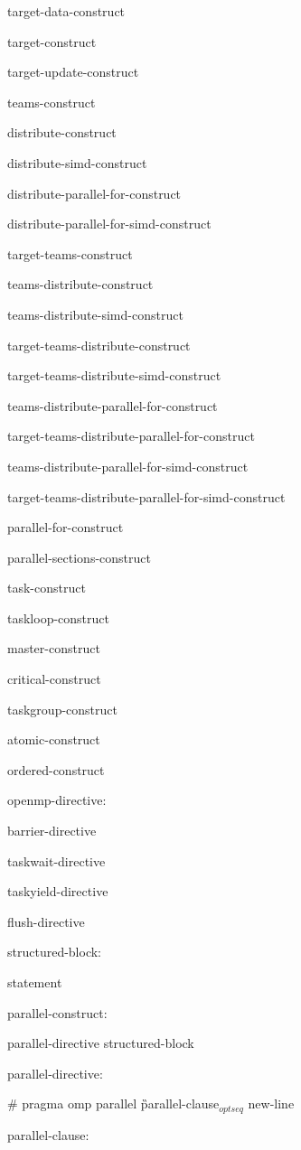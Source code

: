 {\I target-data-construct

\I target-construct

\I target-update-construct

\I teams-construct

\I distribute-construct

\I distribute-simd-construct

\I distribute-parallel-for-construct

\I distribute-parallel-for-simd-construct

\I target-teams-construct

\I teams-distribute-construct

\I teams-distribute-simd-construct

\I target-teams-distribute-construct

\I target-teams-distribute-simd-construct

\I teams-distribute-parallel-for-construct

\I target-teams-distribute-parallel-for-construct

\I teams-distribute-parallel-for-simd-construct

\I target-teams-distribute-parallel-for-simd-construct

\I parallel-for-construct

\I parallel-sections-construct

\I task-construct

\I taskloop-construct

\I master-construct

\I critical-construct

\I taskgroup-construct

\I atomic-construct

\I ordered-construct

openmp-directive:

\I barrier-directive

\I taskwait-directive

\I taskyield-directive

\I flush-directive

structured-block:

\I statement

parallel-construct:

\I parallel-directive structured-block

parallel-directive:

\C\I \# pragma omp parallel \G parallel-clause$_{optseq}$ new-line

parallel-clause:

}

